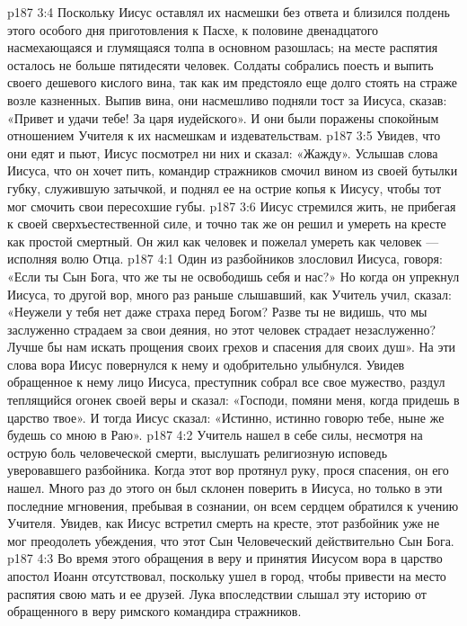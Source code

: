 \vs p187 3:4 Поскольку Иисус оставлял их насмешки без ответа и близился полдень этого особого дня приготовления к Пасхе, к половине двенадцатого насмехающаяся и глумящаяся толпа в основном разошлась; на месте распятия осталось не больше пятидесяти человек. Солдаты собрались поесть и выпить своего дешевого кислого вина, так как им предстояло еще долго стоять на страже возле казненных. Выпив вина, они насмешливо подняли тост за Иисуса, сказав: «Привет и удачи тебе! За царя иудейского». И они были поражены спокойным отношением Учителя к их насмешкам и издевательствам.
\vs p187 3:5 Увидев, что они едят и пьют, Иисус посмотрел ни них и сказал: «Жажду». Услышав слова Иисуса, что он хочет пить, командир стражников смочил вином из своей бутылки губку, служившую затычкой, и поднял ее на острие копья к Иисусу, чтобы тот мог смочить свои пересохшие губы.
\vs p187 3:6 Иисус стремился жить, не прибегая к своей сверхъестественной силе, и точно так же он решил и умереть на кресте как простой смертный. Он жил как человек и пожелал умереть как человек --- исполняя волю Отца.
\vs p187 4:1 Один из разбойников злословил Иисуса, говоря: «Если ты Сын Бога, что же ты не освободишь себя и нас?» Но когда он упрекнул Иисуса, то другой вор, много раз раньше слышавший, как Учитель учил, сказал: «Неужели у тебя нет даже страха перед Богом? Разве ты не видишь, что мы заслуженно страдаем за свои деяния, но этот человек страдает незаслуженно? Лучше бы нам искать прощения своих грехов и спасения для своих душ». На эти слова вора Иисус повернулся к нему и одобрительно улыбнулся. Увидев обращенное к нему лицо Иисуса, преступник собрал все свое мужество, раздул теплящийся огонек своей веры и сказал: «Господи, помяни меня, когда придешь в царство твое». И тогда Иисус сказал: «Истинно, истинно говорю тебе, ныне же будешь со мною в Раю».
\vs p187 4:2 Учитель нашел в себе силы, несмотря на острую боль человеческой смерти, выслушать религиозную исповедь уверовавшего разбойника. Когда этот вор протянул руку, прося спасения, он его нашел. Много раз до этого он был склонен поверить в Иисуса, но только в эти последние мгновения, пребывая в сознании, он всем сердцем обратился к учению Учителя. Увидев, как Иисус встретил смерть на кресте, этот разбойник уже не мог преодолеть убеждения, что этот Сын Человеческий действительно Сын Бога.
\vs p187 4:3 \pc Во время этого обращения в веру и принятия Иисусом вора в царство апостол Иоанн отсутствовал, поскольку ушел в город, чтобы привести на место распятия свою мать и ее друзей. Лука впоследствии слышал эту историю от обращенного в веру римского командира стражников.

